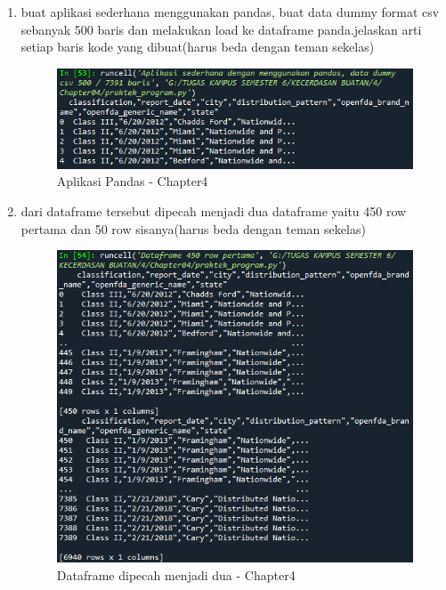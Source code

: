 \begin{enumerate}
	\item buat aplikasi sederhana menggunakan pandas, buat data dummy format csv sebanyak 500 baris dan melakukan load ke dataframe panda.jelaskan arti setiap baris kode yang dibuat(harus beda dengan teman sekelas)
	      \begin{figure}[ht]
		      \centerline{\includegraphics[scale=0.7]{figures/chappter4-1.png}}
		      \caption{Aplikasi Pandas - Chapter4}
		      \label{Aplikasi Pandas - Chapter4}
	      \end{figure}
	      \newpage

	\item dari dataframe tersebut dipecah menjadi dua dataframe yaitu 450 row pertama dan 50 row sisanya(harus beda dengan teman sekelas)
	      \begin{figure}[ht]
		      \centerline{\includegraphics[scale=0.7]{figures/chappter4-2.png}}
		      \caption{Dataframe dipecah menjadi dua - Chapter4}
		      \label{Dataframe dipecah menjadi dua- Chapter4}
	      \end{figure}
	      \newpage


\end{enumerate}
